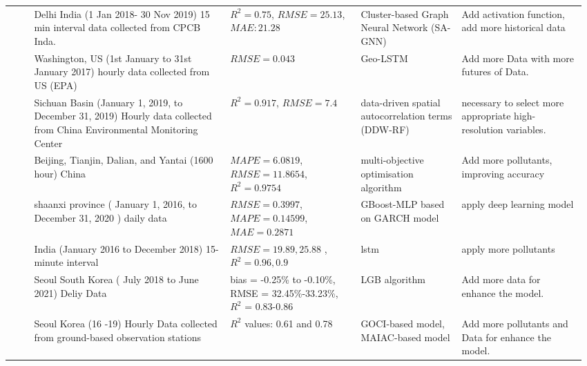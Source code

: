 \begin{landscape}
{\begin{longtable}[h!]{ p{0.04\linewidth} p{0.33\linewidth} p{0.22\linewidth} p{0.17\linewidth} p{0.21\linewidth} }
 \cite{MANDAL2023137036} & Delhi India (1 Jan 2018- 30 Nov 2019) 15 min interval data collected from CPCB Inda. &$R^2=0.75$,  $RMSE=25.13$,  $MAE: 21.28$ & Cluster-based Graph Neural Network (SA-GNN) & Add activation function, add more historical data \\
 \cite{MA2019117729} & Washington, US (1st January to 31st January 2017) hourly data collected from US (EPA) & $RMSE = 0.043$ & Geo-LSTM & Add more Data with more futures of Data.  \\
 \cite{ZHANG2022134890}& Sichuan Basin (January 1,  2019,  to December 31,  2019) Hourly data collected from  China Environmental Monitoring Center  & $R^2= 0.917$, $RMSE=7.4$ & data-driven spatial autocorrelation terms (DDW-RF) & necessary to select more appropriate high-resolution variables. \\
\cite{TIAN2022134048} & Beijing,  Tianjin,  Dalian,  and Yantai (1600 hour) China & $MAPE=6.0819$, $RMSE=11.8654$, $R^2=0.9754$ &  multi-objective optimisation algorithm & Add more pollutants, improving accuracy \\
\cite{DAI2022131898} &shaanxi province ( January 1,  2016, to December 31,  2020 ) daily data & $RMSE=0.3997$, $MAPE=0.14599$, $MAE=0.2871$ &GBoost-MLP based on GARCH model & apply deep learning model \\ 
\cite{AGGARWAL2021129660} & India (January 2016 to December 2018) 15-minute interval  & $RMSE=19.89, 25.88$ ,  $R^2=0.96, 0.9$ &lstm&apply more pollutants \\

 \cite{kim2022short}         & Seoul South Korea ( July 2018 to   June 2021) Deliy Data                                                 & bias = -0.25\% to -0.10\%,  RMSE =   32.45\%-33.23\%,  $R^2$ = 0.83-0.86                                     & LGB algorithm                                                       & Add more data for enhance the model.                                                                            \\





  \cite{lee2021potential}            & Seoul Korea (16 -19) Hourly Data collected from ground-based observation stations                      & $R^2$ values:  0.61 and 0.78                                                                                & GOCI-based model, MAIAC-based model                                & Add more pollutants and Data for enhance the model.                                                                   \\





\end{longtable}}
\end{landscape}
